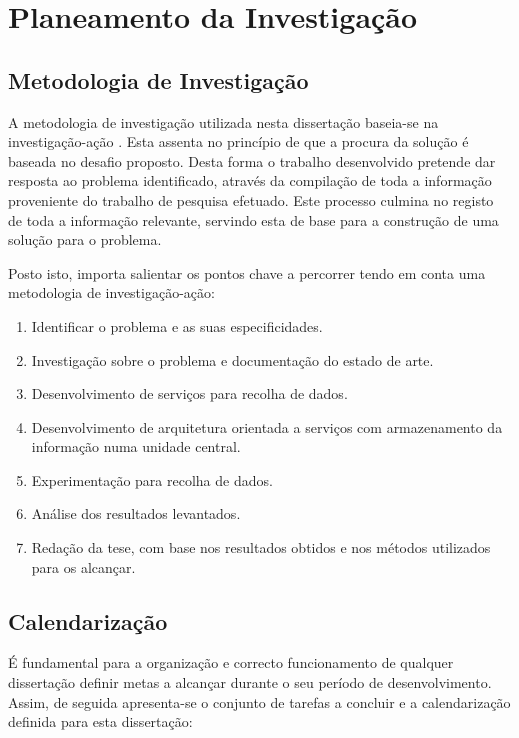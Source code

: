 \chapter{Planeamento da Investigação}
\section{Metodologia de Investigação}
A metodologia de investigação utilizada nesta dissertação baseia-se na investigação-ação \cite{somekh2006action}. Esta assenta no princípio de que a procura da solução é baseada no desafio proposto. Desta forma o trabalho desenvolvido pretende dar resposta ao problema identificado, através da compilação de toda a informação proveniente do trabalho de pesquisa efetuado. Este processo culmina no registo de toda a informação relevante, servindo esta de base para a construção de uma solução para o problema.

Posto isto, importa salientar os pontos chave a percorrer tendo em conta uma metodologia de investigação-ação:
\begin{enumerate}
	\item Identificar o problema e as suas especificidades.
	\item Investigação sobre o problema e documentação do estado de arte.
	\item Desenvolvimento de serviços para recolha de dados.
	\item Desenvolvimento de arquitetura orientada a serviços com armazenamento da informação numa unidade central.
	\item Experimentação para recolha de dados.
	\item Análise dos resultados levantados.
	\item Redação da tese, com base nos resultados obtidos e nos métodos utilizados para os alcançar.
\end{enumerate}


\section{Calendarização}
É fundamental para a organização e correcto funcionamento de qualquer dissertação definir metas a alcançar durante o seu período de desenvolvimento. Assim, de seguida apresenta-se o conjunto de tarefas a concluir e a calendarização definida para esta dissertação:

